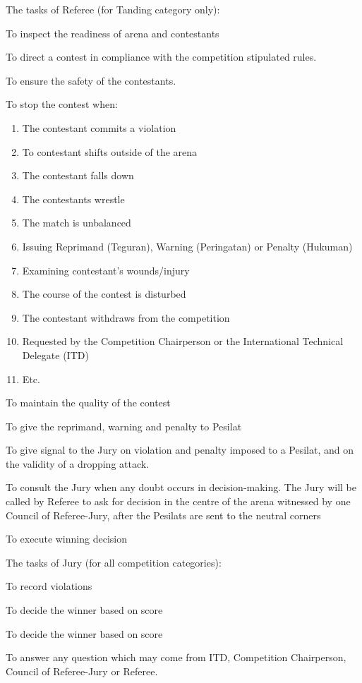 \begin{legal}
\begin{legal}
    \item The tasks of Referee (for Tanding category only):
        \begin{legal}
        \item To inspect the readiness of arena and contestants
        \item To direct a contest in compliance with the competition stipulated rules.
        \item To ensure the safety of the contestants.
        \item To stop the contest when:
            \begin{enumerate}[label=\alph*.]
            \item The contestant commits a violation
            \item To contestant shifts outside of the arena
            \item The contestant falls down
            \item The contestants wrestle
            \item The match is unbalanced
            \item Issuing Reprimand (Teguran), Warning (Peringatan) or Penalty (Hukuman)
            \item Examining contestant’s wounds/injury
            \item The course of the contest is disturbed
            \item The contestant withdraws from the competition
            \item Requested by the Competition Chairperson or the International Technical Delegate (ITD)
            \item Etc.
            \end{enumerate}
        \item To maintain the quality of the contest
        \item To give the reprimand, warning and penalty to Pesilat
        \item To give signal to the Jury on violation and penalty imposed to a Pesilat, and on the validity of a dropping attack.
        \item To consult the Jury when any doubt occurs in decision-making. The Jury will be called by Referee to ask for decision in the centre of the arena witnessed by one Council of Referee-Jury, after the Pesilats are sent to the neutral corners
        \item To execute winning decision
        \end{legal}
    \item The tasks of Jury (for all competition categories):
        \begin{legal}
            \item To record violations
            \item To decide the winner based on score
            \item To decide the winner based on score
            \item To answer any question which may come from ITD, Competition Chairperson, Council of Referee-Jury or Referee.
        \end{legal}


\end{legal}
\end{legal}
